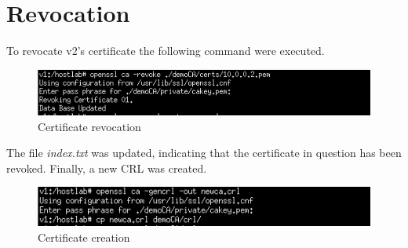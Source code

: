\documentclass[11pt]{article}
\begin{document}
\section{Revocation}
To revocate v2's certificate the following command were executed.
\begin{figure}[H]
	\includegraphics[width=1\textwidth]{img16-hw7-1743261.png}
	\caption{Certificate revocation}
\end{figure}
The file \textit{index.txt} was updated, indicating that the certiﬁcate in question has been revoked. Finally, a new CRL was created.
\begin{figure}[H]
	\includegraphics[width=1\textwidth]{img17-hw7-1743261.png}
	\caption{Certificate creation}
\end{figure}
\end{document}
